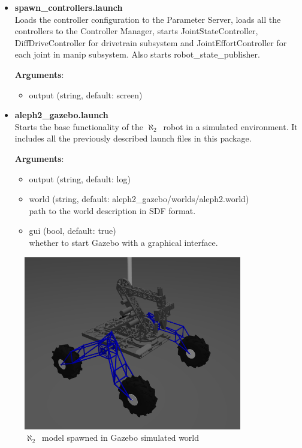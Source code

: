 \documentclass[english,inz,shortabstract]{iithesis}
\newcommand{\val}[1]{\textbf{\textsf{#1}}}
\newcommand{\rovername}{$\aleph_2$\ }
\begin{document}
\begin{itemize}
		\item \val{spawn\_controllers.launch}\\
		Loads the controller configuration to the Parameter Server, loads all the controllers to the Controller Manager, starts \textsf{JointStateController}, \textsf{DiffDriveController} for \textsf{drivetrain} subsystem and \textsf{JointEffortController} for each joint in \textsf{manip} subsystem. Also starts \textsf{robot\_state\_publisher}.

		\textbf{Arguments}:
		\begin{itemize}[itemsep=0pt, parsep=2pt, topsep=0pt]
			\item \textsf{output} (\textsf{string}, default: \textsf{screen})
		\end{itemize}

		\item \val{aleph2\_gazebo.launch}\\
		Starts the base functionality of the \rovername robot in a simulated environment. It includes all the previously described launch files in this package.

		\textbf{Arguments}:
		\begin{itemize}[itemsep=0pt, parsep=2pt, topsep=0pt]
			\item \textsf{output} (\textsf{string}, default: \textsf{log})
			\item \textsf{world} (\textsf{string}, default: \textsf{aleph2\_gazebo/worlds/aleph2.world})\\
			path to the world description in SDF format.
			\item \textsf{gui} (\textsf{bool}, default: \textsf{true})\\
			whether to start Gazebo with a graphical interface.
		\end{itemize}

	\end{itemize}

	\begin{figure}[ht]
		\centering
		\captionsetup{margin=2cm}
		\includegraphics[width=0.85\textwidth]{img/gazebo.png}
		\caption{\rovername model spawned in Gazebo simulated world}
		\label{fig:gazebo}
	\end{figure}
\end{document}
